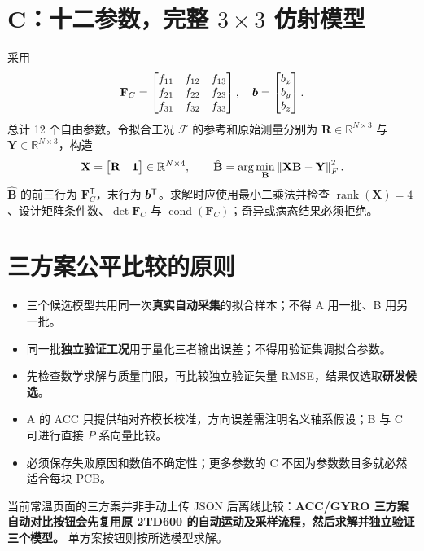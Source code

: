 \section{C：十二参数，完整 \texorpdfstring{$3\times 3$}{3x3} 仿射模型}
采用
\begin{equation}\label{eq:C}
\mathbf F_C=\begin{bmatrix}f_{11}&f_{12}&f_{13}\\f_{21}&f_{22}&f_{23}\\f_{31}&f_{32}&f_{33}\end{bmatrix},
\quad \bm{b}=\begin{bmatrix}b_x\\b_y\\b_z\end{bmatrix}.
\end{equation}
总计 12 个自由参数。令拟合工况 $\mathcal F$ 的参考和原始测量分别为 $\mathbf R\in\mathbb R^{N\times3}$ 与 $\mathbf Y\in\mathbb R^{N\times3}$，构造
\begin{equation}\label{eq:ls}
\mathbf X=\begin{bmatrix}\mathbf R&\bm{1}\end{bmatrix}\in\mathbb R^{N\times4},\qquad
\hat{\mathbf B}=\arg\min_{\mathbf B}\left\lVert \mathbf X\mathbf B-\mathbf Y \right\rVert_F^2.
\end{equation}
$\hat{\mathbf B}$ 的前三行为 $\mathbf F_C^\mathsf T$，末行为 $\bm{b}^\mathsf T$。求解时应使用最小二乘法并检查 $\operatorname{rank}(\mathbf X)=4$、设计矩阵条件数、$\det\mathbf F_C$ 与 $\operatorname{cond}(\mathbf F_C)$；奇异或病态结果必须拒绝。

\section{三方案公平比较的原则}
\begin{itemize}
\item 三个候选模型共用同一次\textbf{真实自动采集}的拟合样本；不得 A 用一批、B 用另一批。
\item 同一批\textbf{独立验证工况}用于量化三者输出误差；不得用验证集调拟合参数。
\item 先检查数学求解与质量门限，再比较独立验证矢量 RMSE，结果仅选取\textbf{研发候选}。
\item A 的 ACC 只提供轴对齐模长校准，方向误差需注明名义轴系假设；B 与 C 可进行直接 $P$ 系向量比较。
\item 必须保存失败原因和数值不确定性；更多参数的 C 不因为参数数目多就必然适合每块 PCB。
\end{itemize}
\begin{notice}
当前常温页面的三方案并非手动上传 JSON 后离线比较：\textbf{ACC/GYRO 三方案自动对比按钮会先复用原 2TD600 的自动运动及采样流程，然后求解并独立验证三个模型。} 单方案按钮则按所选模型求解。
\end{notice}
